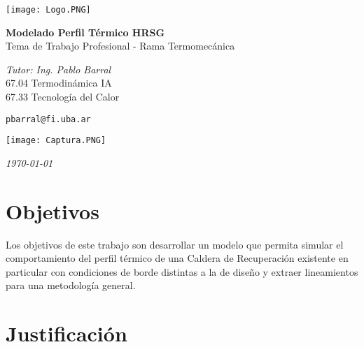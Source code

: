 \documentclass[a4paper]{article}
\begin{document}
\begin{center}

\begin{center}
\texttt{[image: Logo.PNG]} 
\end{center}
\hspace{10pt}

\huge
\textbf{Modelado Perfil Térmico HRSG}\\ 

\Large
Tema de Trabajo Profesional - Rama Termomecánica\\ 

\hspace{10pt}

\large
\textit{Tutor: Ing. Pablo Barral}\\

\small
67.04 Termodinámica IA\\
67.33 Tecnología del Calor\\

\hspace{8pt}

\small  
\texttt{pbarral@fi.uba.ar}\\

\end{center}

\hspace{8pt}

\begin{center}
\texttt{[image: Captura.PNG]} 
\end{center}
\hspace{8pt}

\begin{flushright}
\textit{\today}
\end{flushright}

\newpage
\normalsize

\section*{Objetivos}

Los objetivos de este trabajo son desarrollar un modelo que permita simular el comportamiento del perfil térmico de una Caldera de Recuperación existente en particular con condiciones de borde distintas a la de diseño y extraer lineamientos para una metodología general.

\section*{Justificación}
\end{document}
